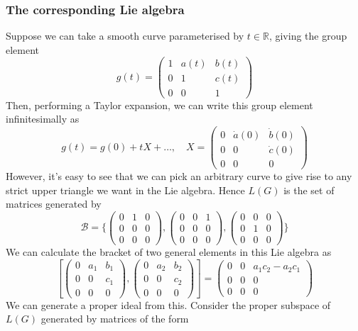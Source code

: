 \subsubsection*{The corresponding Lie algebra} 
Suppose we can take a smooth curve parameterised by $ t \in \mathbb{ R} $, giving the group element 
\[ 
g ( t ) =  \begin{pmatrix} 1 & a( t ) & b( t )  \\ 0 & 1 & c( t )  \\ 0 & 0 & 1 \end{pmatrix}
\] Then, performing a Taylor expansion, we can write this group element infinitesimally as 
\[ 
g( t) = g( 0 )  + t X + \dots, \quad X = \begin{pmatrix} 0 & \dot{ a} ( 0 ) & \dot{b}( 0 )   \\ 0 & 0 & \dot{ c} ( 0 )   \\ 0 & 0 & 0 \end{pmatrix}
\] However, it's easy to see that we can pick an arbitrary curve to give rise to any strict upper triangle we want in the Lie algebra. Hence $L( G ) $ is the set of matrices generated by 
\[ 
 \mathcal{ B }  = \big \{ \begin{pmatrix} 0 & 1 & 0 \\ 0 & 0 & 0 \\ 0 & 0 & 0 \end{pmatrix}, \begin{pmatrix} 0 & 0 & 1 \\ 0 & 0 & 0 \\ 0 & 0 & 0 \end{pmatrix}, \begin{pmatrix} 0 & 0 & 0 \\ 0 & 1 & 0 \\ 0 & 0 & 0 \end{pmatrix} \big \} 
\]  We can calculate the bracket of two general elements in this Lie algebra as 
\[ 
 [ \begin{pmatrix} 0 & a_1 & b_1 \\ 0 & 0 & c_1 \\ 0 & 0 & 0 \end{pmatrix} , \begin{pmatrix} 0 & a_2 & b_2 \\ 0 & 0 & c_2 \\ 0 & 0 & 0 \end{pmatrix} ]   = \begin{pmatrix} 0 & 0 & a_1 c_2  - a_2 c_1 \\ 0 & 0 & 0 \\ 0 & 0 & 0 \end{pmatrix} 
\] We can generate a proper ideal from this. Consider the proper subspace of $ L ( G ) $  generated by matrices of the form 
